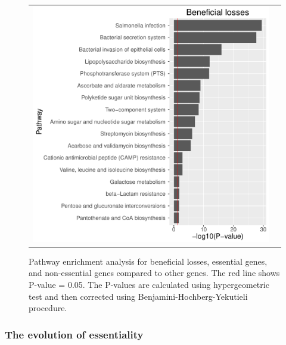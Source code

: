 \documentclass[12pt,letterpaper]{article}
\begin{document}
\begin{figure}
\begin{tabular}{c c}
\includegraphics[scale=0.4]{beneficialloss-pathways.pdf}&
\end{tabular}
\caption{Pathway enrichment analysis for beneficial losses, essential genes, and non-essential genes compared to other genes. The red line shows P-value = 0.05. The P-values are calculated using hypergeometric test and then corrected using Benjamini-Hochberg-Yekutieli procedure.}
\label{fig:essentiality-pathway}
\end{figure}

\subsubsection{The evolution of essentiality}
%
\end{document}
